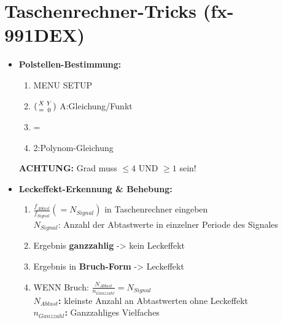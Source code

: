 \documentclass[10pt,a4paper]{article}
\begin{document}
\section{Taschenrechner-Tricks (fx-991DEX)}
\begin{itemize}
    \item \textbf{Polstellen-Bestimmung:}  
   	 \begin{enumerate}
    	 \item \grqq{}MENU SETUP\grqq{}
    	 \item $({X \atop =}{Y \atop 0})$ \grqq{}A:Gleichung/Funkt\grqq{}
    	 \item \grqq{}=\grqq{}
    	 \item \grqq{}2:Polynom-Gleichung\grqq{}
    	 \end{enumerate}
	 \textbf{ACHTUNG:} Grad muss $\leq 4$ UND $\geq 1$ sein!
     \item \textbf{Leckeffekt-Erkennung \& Behebung:}
     	 \begin{enumerate}
     	 \item $\frac{f_{Abtast}}{f_{Signal}}(=N_{Signal})$ in Taschenrechner eingeben\\
     	 $N_{Signal}$: Anzahl der Abtastwerte in einzelner Periode des Signales
     	 \item Ergebnis \textbf{ganzzahlig} -> kein Leckeffekt
     	 \item Ergebnis in \textbf{Bruch-Form} -> Leckeffekt
     	 \item WENN Bruch: $\frac{N_{Abtast}}{n_{Ganzzahl}}=N_{Signal}$\\
     	 \textbf{$N_{Abtast}$: } kleinste Anzahl an Abtastwerten ohne Leckeffekt\\
     	 \textbf{$n_{Ganzzahl}$: } Ganzzahliges Vielfaches
         \end{enumerate}	 	 
\end{itemize}
\end{document}
